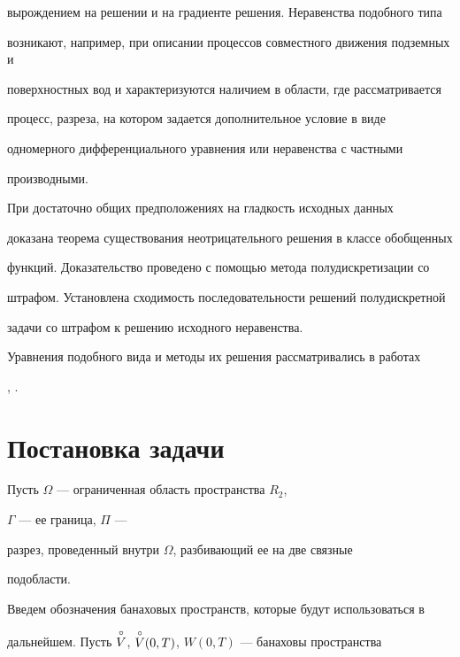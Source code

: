 вырождением на решении и на градиенте решения. Неравенства подобного типа 


возникают, например, при описании процессов совместного движения подземных и 


поверхностных вод и характеризуются наличием в области, где рассматривается 


процесс, разреза, на котором задается дополнительное условие в виде 


одномерного дифференциального уравнения или неравенства с частными 


производными. 


 


При достаточно общих предположениях на гладкость исходных данных 


доказана теорема существования неотрицательного решения в классе обобщенных 


функций. Доказательство проведено с помощью метода полудискретизации со 


штрафом. Установлена сходимость последовательности решений полудискретной 


задачи со штрафом к решению исходного неравенства. 


 


Уравнения подобного вида и методы их решения рассматривались в работах 


\cite{GP1}, \cite{GP2}. 


 


\section{Постановка задачи} 


 


Пусть $\Omega$ --- ограниченная область пространства $R_2$, 


$\Gamma$ --- ее граница, $\Pi$ --- 


разрез, проведенный внутри $\Omega$, разбивающий ее на две связные 


подобласти. 


 


Введем обозначения банаховых пространств, которые будут использоваться в 


дальнейшем. Пусть $\overset{\circ} V$, $\overset{\circ} V(0,T)$, $W(0,T)$ --- банаховы пространства 


